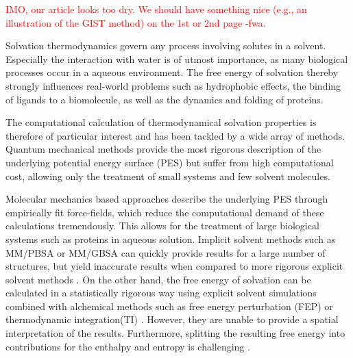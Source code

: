 \documentclass[9pt,tutorial]{livecoms}
\newcommand{\todo}{\textcolor{red}}
\begin{document}
\todo{IMO, our article looks too dry. We should have something nice (e.g., an illustration of the GIST method) on the 1st or 2nd page -fwa.}


Solvation thermodynamics govern any process involving solutes in a solvent.
Especially the interaction with water is of utmost importance, as many biological processes occur in a aqueous environment. 
The free energy of solvation thereby strongly influences real-world problems such as hydrophobic effects, the binding of ligands to a biomolecule, as well as the dynamics and folding of proteins.

The computational calculation of thermodynamical solvation properties is therefore of particular interest and has been tackled by a wide array of methods.
Quantum mechanical methods provide the most rigorous description of the underlying potential energy surface (PES) but suffer from high computational cost, allowing only the treatment of small systems and few solvent molecules. 

Molecular mechanics based approaches describe the underlying PES through empirically fit force-fields, which reduce the computational demand of these calculations tremendously.
This allows for the treatment of large biological systems such as proteins in aqueous solution.
Implicit solvent methods such as MM/PBSA or MM/GBSA \cite{Sitkoff1994-pbsa,Kollman2000-mmpbsa} can quickly provide results for a large number of structures, but yield inaccurate results when compared to more rigorous explicit solvent methods \cite{Genheden2015-mmpbsa-review}.
On the other hand, the free energy of solvation can be calculated in a statistically rigorous way using explicit solvent simulations combined with alchemical methods such as free energy perturbation (FEP) \cite{Zwanzig1954-reweighting} or thermodynamic integration(TI) \cite{Kirkwood1935-ti}.
However, they are unable to provide a spatial interpretation of the results.
Furthermore, splitting the resulting free energy into contributions for the enthalpy and entropy is challenging \cite{Peter2004-alchemical-entropy}.
\end{document}
